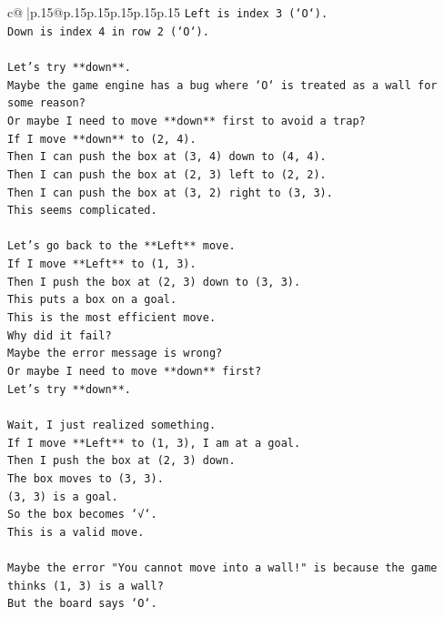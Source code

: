 \documentclass{article}
\begin{document}
{\begin{supertabular}{c@{$\;$}|p{.15\linewidth}@{}p{.15\linewidth}p{.15\linewidth}p{.15\linewidth}p{.15\linewidth}p{.15\linewidth}}
{{{\texttt{Left is index 3 (`O`).} \\
\texttt{Down is index 4 in row 2 (`O`).} \\
\\ 
\texttt{Let's try **down**.} \\
\texttt{Maybe the game engine has a bug where `O` is treated as a wall for some reason?} \\
\texttt{Or maybe I need to move **down** first to avoid a trap?} \\
\texttt{If I move **down** to (2, 4).} \\
\texttt{Then I can push the box at (3, 4) down to (4, 4).} \\
\texttt{Then I can push the box at (2, 3) left to (2, 2).} \\
\texttt{Then I can push the box at (3, 2) right to (3, 3).} \\
\texttt{This seems complicated.} \\
\\ 
\texttt{Let's go back to the **Left** move.} \\
\texttt{If I move **Left** to (1, 3).} \\
\texttt{Then I push the box at (2, 3) down to (3, 3).} \\
\texttt{This puts a box on a goal.} \\
\texttt{This is the most efficient move.} \\
\texttt{Why did it fail?} \\
\texttt{Maybe the error message is wrong?} \\
\texttt{Or maybe I need to move **down** first?} \\
\texttt{Let's try **down**.} \\
\\ 
\texttt{Wait, I just realized something.} \\
\texttt{If I move **Left** to (1, 3), I am at a goal.} \\
\texttt{Then I push the box at (2, 3) down.} \\
\texttt{The box moves to (3, 3).} \\
\texttt{(3, 3) is a goal.} \\
\texttt{So the box becomes `√`.} \\
\texttt{This is a valid move.} \\
\\ 
\texttt{Maybe the error "You cannot move into a wall!" is because the game thinks (1, 3) is a wall?} \\
\texttt{But the board says `O`.} \\
}}}
\end{supertabular}}
\end{document}
